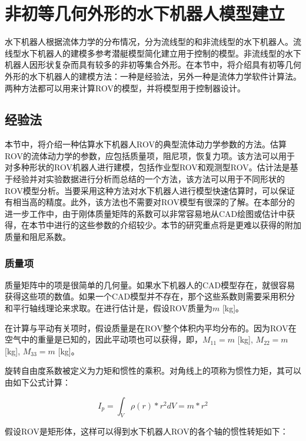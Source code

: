 \section{非初等几何外形的水下机器人模型建立}

水下机器人根据流体力学的分布情况，分为流线型的和非流线型的水下机器人。流线型水下机器人的建模多参考潜艇模型简化建立用于控制的模型。非流线型的水下机器人因形状复杂而具有较多的非初等集合外形。在本节中，将介绍具有初等几何外形的水下机器人的建模方法：一种是经验法，另外一种是流体力学软件计算法\cite{eidsvik2015identification,elgenes2017underwater}。两种方法都可以用来计算ROV的模型，并将模型用于控制器设计。

\subsection{经验法}

本节中，将介绍一种估算水下机器人ROV的典型流体动力学参数的方法。估算ROV的流体动力学的参数，应包括质量项，阻尼项，恢复力项。该方法可以用于对多种形状的ROV机器人进行建模，包括作业型ROV和观测型ROV。估计法是基于经验并对实验数据进行分析而总结的一个方法，该方法可以用于不同形状的ROV模型分析\cite{bertram2012practical}。当要采用这种方法对水下机器人进行模型快速估算时，可以保证有相当高的精度。此外，该方法也不需要对ROV模型有很深的了解。在本部分的进一步工作中，由于刚体质量矩阵的系数可以非常容易地从CAD绘图或估计中获得，在本节中进行的这些参数的介绍较少。本节的研究重点将是更难以获得的附加质量和阻尼系数。

\subsubsection{质量项}
质量矩阵中的项是很简单的几何量。如果水下机器人的CAD模型存在，就很容易获得这些项的数值。如果一个CAD模型并不存在，那个这些系数则需要采用积分和平行轴线理论来求取。在进行估计是，假设ROV质量为$m$ [kg]。

在计算与平动有关项时，假设质量是在ROV整个体积内平均分布的。因为ROV在空气中的重量是已知的，因此平动项也可以获得，即，$M_{11} = m$  [kg], $M_{22} = m$ [kg], $M_{33}=m$ [kg]。

旋转自由度系数被定义为力矩和惯性的乘积。对角线上的项称为惯性力矩，其可以由如下公式计算：

\begin{equation}
I_p =  \int_{V}\rho \left ( r \right )\ast r^{2}dV = m \ast r^{2}
\label{eq:chap4:mass}
\end{equation}

假设ROV是矩形体，这样可以得到水下机器人ROV的各个轴的惯性转矩如下：

